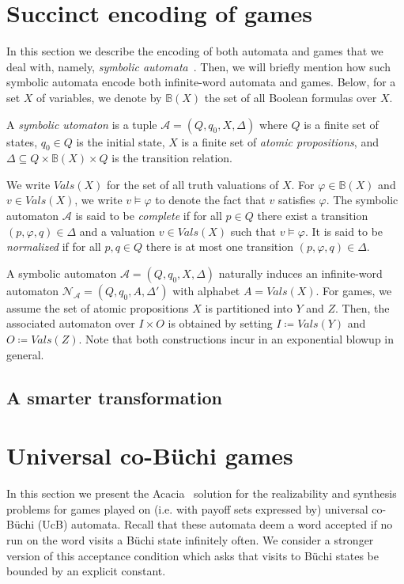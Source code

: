 \documentclass[runningheads,a4paper,draft]{llncs}
\newcommand{\Vals}{\mathit{Vals}}
\newcommand{\calA}{\mathcal{A}}
\newcommand{\calN}{\mathcal{N}}
\begin{document}
\section{Succinct encoding of games}
In this section we describe the encoding of both automata and games that we
deal with, namely, \emph{symbolic automata}~\cite{dv17}. Then, we will briefly mention how
such symbolic automata encode both infinite-word automata and games. Below,
for a set $X$ of variables, we denote by $\mathbb{B}(X)$ the set of all
Boolean formulas over $X$.
\begin{definition}
  A \emph{symbolic utomaton} is a tuple $\calA = (Q,q_0,X,\Delta)$ where $Q$
  is a finite set of states, $q_0 \in Q$ is the initial state, $X$ is a finite
  set of \emph{atomic propositions}, and $\Delta \subseteq Q \times
  \mathbb{B}(X) \times Q$ is the transition relation.
\end{definition}
%
We write $\Vals(X)$ for the set of all truth valuations of $X$. For $\varphi
\in \mathbb{B}(X)$ and $v \in \Vals(X)$, we write $v \models \varphi$ to
denote the fact that $v$ satisfies $\varphi$. The symbolic automaton $\calA$
is said to be \emph{complete} if for all $p \in Q$ there exist a transition
$(p,\varphi,q) \in \Delta$ and a valuation $v \in \Vals(X)$ such that $v
\models \varphi$. It is said to be \emph{normalized} if for all $p,q \in Q$
there is at most one transition $(p,\varphi,q) \in \Delta$.

A symbolic automaton $\calA = (Q,q_0,X,\Delta)$ naturally induces an infinite-word automaton
$\calN_\calA = (Q,q_0,A,\Delta')$ with alphabet $A = \Vals(X)$. For games, we
assume the set of atomic propositions $X$ is partitioned into $Y$ and $Z$.
Then, the associated automaton over $I \times O$ is obtained by setting $I
\coloneqq \Vals(Y)$ and $O \coloneqq \Vals(Z)$. Note that both constructions
incur in an exponential blowup in general.

\subsection{A smarter transformation}



\section{Universal co-B\"uchi games}
In this section we present the Acacia~\cite{acacia} solution for the
realizability and synthesis problems for games played on (i.e. with payoff sets
expressed by) universal co-B\"uchi (UcB) automata.  Recall that these automata
deem a word accepted if no run on the word visits a B\"uchi state infinitely
often.  We consider a stronger version of this acceptance condition which asks
that visits to B\"uchi states be bounded by an explicit constant.
\end{document}

